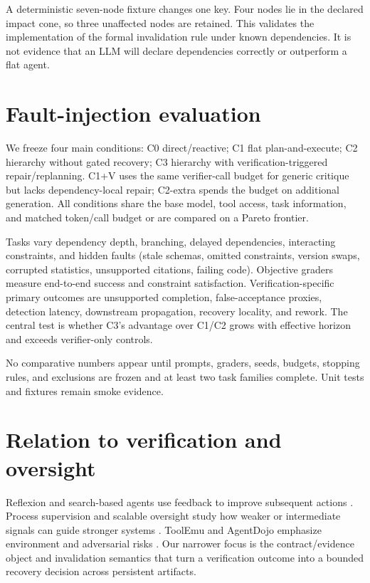 \documentclass{article}
\begin{document}
A deterministic seven-node fixture changes one key. Four nodes lie in the declared impact cone, so three unaffected nodes are retained. This validates the implementation of the formal invalidation rule under known dependencies. It is not evidence that an LLM will declare dependencies correctly or outperform a flat agent.

\section{Fault-injection evaluation}
We freeze four main conditions: C0 direct/reactive; C1 flat plan-and-execute; C2 hierarchy without gated recovery; C3 hierarchy with verification-triggered repair/replanning. C1+V uses the same verifier-call budget for generic critique but lacks dependency-local repair; C2-extra spends the budget on additional generation. All conditions share the base model, tool access, task information, and matched token/call budget or are compared on a Pareto frontier.

Tasks vary dependency depth, branching, delayed dependencies, interacting constraints, and hidden faults (stale schemas, omitted constraints, version swaps, corrupted statistics, unsupported citations, failing code). Objective graders measure end-to-end success and constraint satisfaction. Verification-specific primary outcomes are unsupported completion, false-acceptance proxies, detection latency, downstream propagation, recovery locality, and rework. The central test is whether C3's advantage over C1/C2 grows with effective horizon and exceeds verifier-only controls.

No comparative numbers appear until prompts, graders, seeds, budgets, stopping rules, and exclusions are frozen and at least two task families complete. Unit tests and fixtures remain smoke evidence.

\section{Relation to verification and oversight}
Reflexion and search-based agents use feedback to improve subsequent actions \citep{shinn2023reflexion,zhou2024lats}. Process supervision and scalable oversight study how weaker or intermediate signals can guide stronger systems \citep{lightman2023verify,irving2018debate,leike2018recursive,burns2024weakstrong}. ToolEmu and AgentDojo emphasize environment and adversarial risks \citep{ruan2024toolemu,debenedetti2024agentdojo}. Our narrower focus is the contract/evidence object and invalidation semantics that turn a verification outcome into a bounded recovery decision across persistent artifacts.
\end{document}
